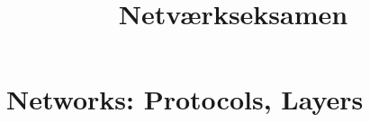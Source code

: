 \documentclass[12pt]{report}
\title{
	{Netværkseksamen}\\
}
\author{

}
\date{

}
\begin{document}
\maketitle

\tableofcontents

\chapter{Networks: Protocols, Layers}

\end{document}
